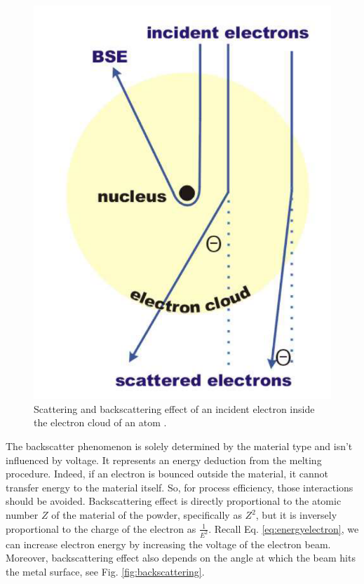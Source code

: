 \begin{figure}[H]
    \centering
    \includegraphics[scale=0.4]{Images/electrons.png}
    \caption[Scattering and backscattering of an electron.]{Scattering and backscattering effect of an incident electron inside the electron cloud of an atom \cite{krumeich_properties_nodate}.}
    \label{fig:electronsscattering}
\end{figure}
The backscatter phenomenon is solely determined by the material type and isn't influenced by voltage. It represents an energy deduction from the melting procedure. Indeed, if an electron is bounced outside the material, it cannot transfer energy to the material itself. So, for process efficiency, those interactions should be avoided. Backscattering effect is directly proportional to the atomic number $Z$ of the material of the powder, specifically as $Z^2$, but it is inversely proportional to the charge of the electron as $\frac{1}{E^2}$. Recall Eq. \ref{eq:energyelectron}, we can increase electron energy by increasing the voltage of the electron beam. Moreover, backscattering effect also depends on the angle at which the beam hits the metal surface, see Fig. \ref{fig:backscattering}.
